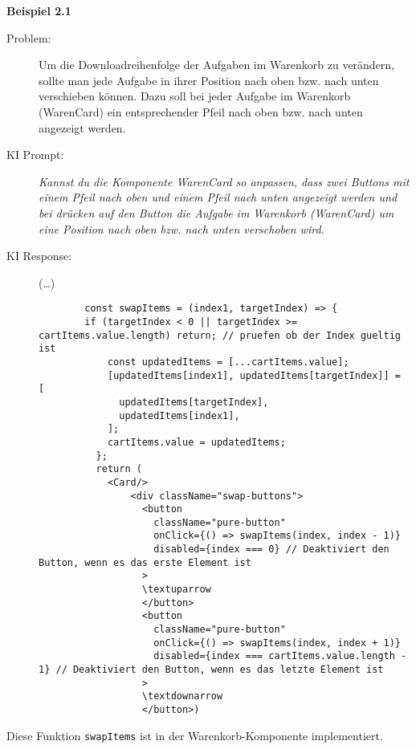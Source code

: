 \textbf{Beispiel 2.1} 
\begin{description}
    \item[Problem:] 
Um die Downloadreihenfolge der Aufgaben im Warenkorb zu verändern, sollte man jede Aufgabe in ihrer Position nach oben bzw. nach unten verschieben können. Dazu soll bei jeder Aufgabe im Warenkorb (WarenCard) ein entsprechender Pfeil nach oben bzw. nach unten angezeigt werden. 
    \item[KI Prompt:] \emph{ Kannst du die Komponente WarenCard so anpassen, dass zwei Buttons mit einem Pfeil nach oben und einem Pfeil nach unten angezeigt werden und bei drücken auf den Button die Aufgabe im Warenkorb (WarenCard) um eine Position nach oben bzw. nach unten verschoben wird. }
    \item[KI Response:] (\ldots)
    \begin{lstlisting}
        const swapItems = (index1, targetIndex) => {
        if (targetIndex < 0 || targetIndex >= cartItems.value.length) return; // pruefen ob der Index gueltig ist
            const updatedItems = [...cartItems.value];
            [updatedItems[index1], updatedItems[targetIndex]] = [
              updatedItems[targetIndex],
              updatedItems[index1],
            ];
            cartItems.value = updatedItems;
          };
          return (
            <Card/>
                <div className="swap-buttons">
                  <button
                    className="pure-button"
                    onClick={() => swapItems(index, index - 1)}
                    disabled={index === 0} // Deaktiviert den Button, wenn es das erste Element ist
                  >
                  \textuparrow
                  </button>
                  <button
                    className="pure-button"
                    onClick={() => swapItems(index, index + 1)}
                    disabled={index === cartItems.value.length - 1} // Deaktiviert den Button, wenn es das letzte Element ist
                  >
                  \textdownarrow
                  </button>)
    \end{lstlisting}
\end{description}

Diese Funktion \texttt{swapItems} ist in der Warenkorb-Komponente implementiert. 


